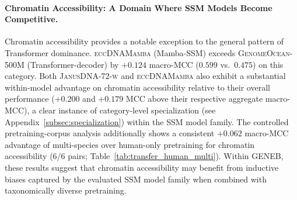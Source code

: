 \documentclass{llmxive}
\begin{document}
\paragraph{Chromatin Accessibility: A Domain Where SSM Models Become Competitive.}
Chromatin accessibility provides a notable exception to the general
pattern of Transformer dominance. \textsc{eccDNAMamba} (Mamba-SSM)
exceeds \textsc{GenomeOcean-500M} (Transformer-decoder) by $+0.124$
macro-MCC ($0.599$ vs.\ $0.475$) on this category. Both \textsc{JanusDNA-72-w} and \textsc{eccDNAMamba} also exhibit a
substantial within-model advantage on chromatin accessibility
relative to their overall performance ($+0.200$ and $+0.179$ MCC
above their respective aggregate macro-MCC), a clear instance of
category-level specialization (see Appendix~\ref{subsec:specialization}) within the SSM model family. The controlled pretraining-corpus
analysis additionally shows a consistent $+0.062$ macro-MCC advantage
of multi-species over human-only pretraining for chromatin
accessibility ($6$/$6$ pairs;
Table~\ref{tab:transfer_human_multi}). Within GENEB, these results
suggest that chromatin accessibility may benefit from inductive biases
captured by the evaluated SSM model family when combined with
taxonomically diverse pretraining.
\end{document}
